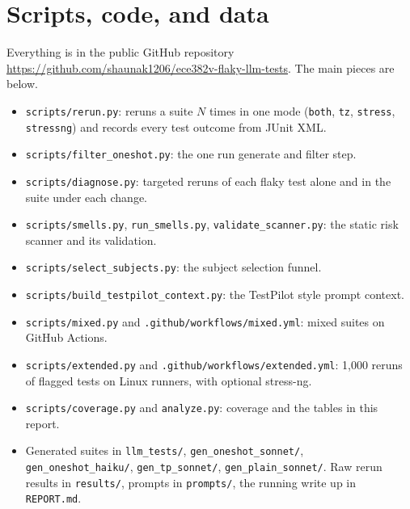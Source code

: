 \documentclass[sigconf,nonacm]{acmart}
\begin{document}
\section{Scripts, code, and data}
Everything is in the public GitHub repository \url{https://github.com/shaunak1206/ece382v-flaky-llm-tests}. The main pieces are below.
\begin{itemize}
\item \texttt{scripts/rerun.py}: reruns a suite $N$ times in one mode (\texttt{both}, \texttt{tz}, \texttt{stress}, \texttt{stressng}) and records every test outcome from JUnit XML.
\item \texttt{scripts/filter\_oneshot.py}: the one run generate and filter step.
\item \texttt{scripts/diagnose.py}: targeted reruns of each flaky test alone and in the suite under each change.
\item \texttt{scripts/smells.py}, \texttt{run\_smells.py}, \texttt{validate\_scanner.py}: the static risk scanner and its validation.
\item \texttt{scripts/select\_subjects.py}: the subject selection funnel.
\item \texttt{scripts/build\_testpilot\_context.py}: the TestPilot style prompt context.
\item \texttt{scripts/mixed.py} and \texttt{.github/workflows/mixed.yml}: mixed suites on GitHub Actions.
\item \texttt{scripts/extended.py} and \texttt{.github/workflows/extended.yml}: 1,000 reruns of flagged tests on Linux runners, with optional stress-ng.
\item \texttt{scripts/coverage.py} and \texttt{analyze.py}: coverage and the tables in this report.
\item Generated suites in \texttt{llm\_tests/}, \texttt{gen\_oneshot\_sonnet/}, \texttt{gen\_oneshot\_haiku/}, \texttt{gen\_tp\_sonnet/}, \texttt{gen\_plain\_sonnet/}. Raw rerun results in \texttt{results/}, prompts in \texttt{prompts/}, the running write up in \texttt{REPORT.md}.
\end{itemize}
\end{document}
